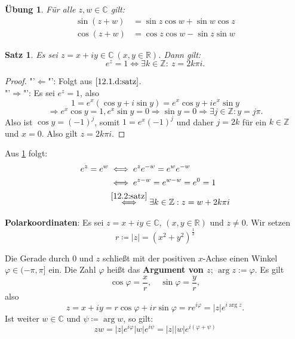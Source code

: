 \documentclass[12pt]{extreport} %
\newcommand{\C}{\mathbb{C}}
\newcommand{\R}{\mathbb{R}}
\newcommand{\Z}{\mathbb{Z}}
\theoremstyle{named}
\theoremstyle{itshape}
\newtheorem{satz}[unnamedtheorem]{Satz}
\theoremstyle{normal}
\newtheorem*{uebung}{Übung}
\begin{document}
{\begin{uebung}
	Für alle $z, w \in \C$ gilt:
	\begin{align*}
		\sin (z + w) & = \sin z \cos w + \sin w \cos z \\
		\cos (z + w) & = \cos z \cos w - \sin z \sin w
	\end{align*}	
\end{uebung}


\begin{satz} \label{12.2:satz}
	Es sei $z = x + i y \in \C ~(x, y \in \R)$. Dann gilt:
	$$ e^{z} = 1 \iff \exists k \in \Z: ~ z = 2 k \pi i. $$
\end{satz}


	
\begin{proof}
	"'$\Leftarrow$"': Folgt aus $\ref{12.1.d:satz}$. \\
	"'$\Rightarrow$"': Es sei $e^{z} = 1$, also 
	  $$1 = e^{x} ( \cos y + i \sin y) = e^{x} \cos y + i e^{x} \sin y$$
	  $$\Rightarrow e^{x} \cos y = 1, e^{x} \sin y = 0 \Rightarrow \sin y = 0 \Rightarrow \exists j \in \Z: y = j \pi.$$
	  Also ist $\cos y = (-1)^{j}$, somit $1 = e^{x} (-1)^{j}$ und daher $j = 2k$ für ein $k \in \Z$ und $x = 0$. 
	  Also gilt $z = 2k \pi i$.
\end{proof}

Aus \ref{12.2:satz} folgt:
	\begin{align*}
		e^{z} = e^{w} & \iff e^{z} e^{-w} = e^{w} e^{-w} \\
			& \iff e^{z-w} = e^{w - w} = e^{0} =1 \\
			& \overset{\ref{12.2:satz}}{\iff} \exists k \in \Z: z = w + 2 k \pi i
	\end{align*}


 
\textbf{Polarkoordinaten}: Es sei $z = x + iy \in \C$, $(x, y \in \R)$ und $z \neq 0$. Wir setzen
	$$ r \coloneqq |z| = (x^{2} + y^{2})^{\frac{1}{2}} $$
	
	Die Gerade durch $0$ und $z$ schließt mit der positiven $x$-Achse einen Winkel $\varphi \in (-\pi, \pi]$ ein.
	Die Zahl $\varphi$ hei{\ss}t das \textbf{Argument von $z$}; $\arg z:= \varphi$. Es gilt
		$$ \cos \varphi = \frac{x}{r}, \quad \sin \varphi = \frac{y}{r}, $$
	also
		$$  z = x + iy = r \cos \varphi + i r \sin \varphi = r e^{i \varphi} =  |z| e^{i \arg z}. $$
	Ist weiter $w \in \C$ und $\psi \coloneqq \arg w$, so gilt:
		$$ z w = |z| e^{i \varphi} |w| e^{i \psi} = |z| |w| e^{i(\varphi + \psi)} $$
	
	


}
\end{document}

